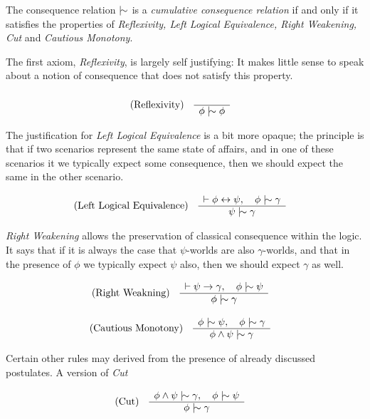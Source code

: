 \begin{definition}
  \label{definition:cumulative-consequence-relation} The consequence relation $\twiddle$ is a \emph{cumulative consequence relation} if and
  only if it satisfies the properties of \emph{Reflexivity, Left Logical Equivalence, Right Weakening, Cut} and \emph{Cautious Monotony}.
\end{definition}

The first axiom, \textit{Reflexivity}, is largely self justifying: It makes little sense to speak about a notion of consequence that does not
satisfy this property.

\begin{align}
  \label{postulate:ref}\inferLeft{Reflexivity}{}{\phi \twiddle \phi}
\end{align}

The justification for \textit{Left Logical Equivalence} is a bit more opaque; the principle is that if two scenarios represent the same
state of affairs, and in one of these scenarios it we typically expect some consequence, then we should expect the same in the other
scenario.

\begin{align}
  \label{postulate:lle}\inferLeft{Left Logical Equivalence}{\vdash \phi \leftrightarrow \psi, \quad \phi \twiddle \gamma}{\psi \twiddle \gamma}
\end{align}

\textit{Right Weakening} allows the preservation of classical consequence within the logic. It says that if it is always the case that $\psi$-worlds
are also $\gamma$-worlds, and that in the presence of $\phi$ we typically expect $\psi$ also, then we should expect $\gamma$ as well.

\begin{align}
  \label{postulate:rw}\inferLeft{Right Weakning}{\vdash \psi \rightarrow \gamma, \quad \phi \twiddle \psi}{\phi \twiddle \gamma}
\end{align}

\begin{align}
  \label{postulate:cm}\inferLeft{Cautious Monotony}{\phi \twiddle \psi, \quad \phi \twiddle \gamma }{\phi \land \psi \twiddle \gamma}
\end{align}

Certain other rules may derived from the presence of already discussed postulates. A version of \textit{Cut}

\begin{align}
  \label{postulate:cut}\inferLeft{Cut}{\phi \land \psi \twiddle \gamma, \quad \phi \twiddle \psi}{\phi \twiddle \gamma}
\end{align}

